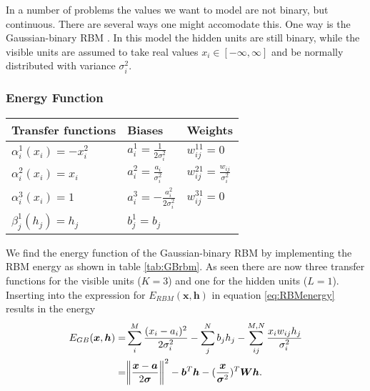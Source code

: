 \documentclass[twoside,english]{uiofysmaster}
\newcommand{\ra}[1]{\renewcommand{\arraystretch}{#1}}
\DeclarePairedDelimiter{\norm}{\lVert}{\rVert}
\begin{document}
In a number of problems the values we want to model are not binary, but continuous. There are several ways one might accomodate this. One way is the Gaussian-binary RBM \cite{Welling2005}. In this model the hidden units are still binary, while the visible units are assumed to take real values $x_i \in [-\infty, \infty]$ and be normally distributed with variance $\sigma_i^2$. 

\subsubsection{Energy Function}



\begin{table*}\centering
\ra{1.3}
\caption{This table shows how the terms in the restricted Boltzmann machine (RBM) energy function (equation \ref{eq:RBMenergy}) should be implemented in order to yield the Gaussian-binary restricted boltzmann machine, that is an RBM where the visible units take continuous values and the hidden units take binary values.}
\label{tab:GBrbm}
\begin{tabular}{lll}
\toprule
\toprule
Transfer functions & Biases & Weights \\ 
\midrule 
$\alpha_i^1 (x_i) = -x_i^2$  & $a_i^1 = \frac{1}{2\sigma_i^2}$      & $w_{ij}^{11} = 0$ \\
$\alpha_i^2 (x_i) = x_i$     & $a_i^2 = \frac{a_i}{\sigma_i^2}$     & $w_{ij}^{21} = \frac{w_{ij}}{\sigma_i^2}$ \\
$\alpha_i^3 (x_i) = 1$       & $a_i^3 = -\frac{a_i^2}{2\sigma_i^2}$ & $w_{ij}^{31} = 0$ \\
$\beta_j^1 (h_j) = h_j$      & $b_j^1 = b_j$                        &  \\
\bottomrule
\bottomrule
\end{tabular}
\end{table*}

We find the energy function of the Gaussian-binary RBM by implementing the RBM energy as shown in table \ref{tab:GBrbm}. As seen there are now three transfer functions for the visible units ($K=3$) and one for the hidden units ($L=1$).
Inserting into the expression for $E_{RBM}(\bm{x},\bm{h})$ in equation \ref{eq:RBMenergy} results in the energy
\begin{align}
	E_{GB}(\bm{x}, \bm{h}) =& \sum_i^M \frac{(x_i - a_i)^2}{2\sigma_i^2}
	- \sum_j^N b_j h_j 
	-\sum_{ij}^{M,N} \frac{x_i w_{ij} h_j}{\sigma_i^2} \nonumber \\
	=& \norm*{\frac{\bm{x} -\bm{a}}{2\bm{\sigma}}}^2 - \bm{b}^T \bm{h} 
	- (\frac{\bm{x}}{\bm{\sigma}^2})^T \bm{W}\bm{h} . \label{eq:GBenergy}
\end{align}
\end{document}
